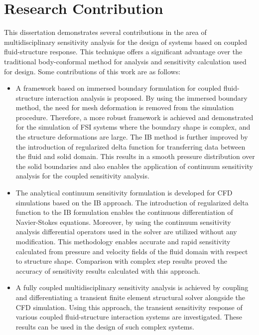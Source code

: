 \section{Research Contribution}
This dissertation demonstrates several contributions in the area of multidisciplinary sensitivity analysis for the design of systems based on coupled fluid-structure response. This technique offers a significant advantage over the traditional body-conformal method for analysis and sensitivity calculation used for design. Some contributions of this work are as follows:
\begin{itemize}
    \item A framework based on immersed boundary formulation for coupled fluid-structure interaction analysis is proposed. By using the immersed boundary method, the need for mesh deformation is removed from the simulation procedure. Therefore, a more robust framework is achieved and demonstrated for the simulation of FSI systems where the boundary shape is complex, and the structure deformations are large. The IB method is further improved by the introduction of regularized delta function for transferring data between the fluid and solid domain. This results in a smooth pressure distribution over the solid boundaries and also enables the application of continuum sensitivity analysis for the coupled sensitivity analysis.
    \item The analytical continuum sensitivity formulation is developed for CFD simulations based on the IB approach. The introduction of regularized delta function to the IB formulation enables the continuous differentiation of Navier-Stokes equations. Moreover, by using the continuum sensitivity analysis differential operators used in the solver are utilized without any modification. This methodology enables accurate and rapid sensitivity calculated from pressure and velocity fields of the fluid domain with respect to structure shape. Comparison with complex step results proved the accuracy of sensitivity results calculated with this approach.
    \item A fully coupled multidisciplinary sensitivity analysis is achieved by coupling and differentiating a transient finite element structural solver alongside the CFD simulation. Using this approach, the transient sensitivity response of various coupled fluid-structure interaction systems are investigated. These results can be used in the design of such complex systems.
\end{itemize}

